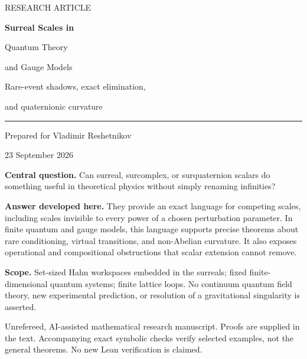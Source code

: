 \documentclass[11pt,oneside]{article}
\numberwithin{equation}{section}
\theoremstyle{plain}
\theoremstyle{definition}
\theoremstyle{remark}
\begin{document}
\begin{titlepage}
\color{ink}
\vspace*{14mm}
{\small\sffamily RESEARCH ARTICLE\par}
\vspace{10mm}
{\Huge\bfseries Surreal Scales in\par Quantum Theory\par and Gauge Models\par}
\vspace{9mm}
{\Large Rare-event shadows, exact elimination,\par and quaternionic curvature\par}
\vspace{13mm}
\noindent\rule{\textwidth}{0.7pt}
\vspace{5mm}
{\large Prepared for Vladimir Reshetnikov\par}
{\normalsize 23 September 2026\par}
\vspace{12mm}
\noindent\begin{minipage}{0.94\textwidth}
\textbf{Central question.} Can surreal, surcomplex, or surquaternion scalars do something useful in theoretical physics without simply renaming infinities?

\medskip
\textbf{Answer developed here.} They provide an exact language for competing scales, including scales invisible to every power of a chosen perturbation parameter. In finite quantum and gauge models, this language supports precise theorems about rare conditioning, virtual transitions, and non-Abelian curvature. It also exposes operational and compositional obstructions that scalar extension cannot remove.

\medskip
\textbf{Scope.} Set-sized Hahn workspaces embedded in the surreals; fixed finite-dimensional quantum systems; finite lattice loops. No continuum quantum field theory, new experimental prediction, or resolution of a gravitational singularity is asserted.
\end{minipage}
\vfill
{\small\color{muted}Unrefereed, AI-assisted mathematical research manuscript. Proofs are supplied in the text. Accompanying exact symbolic checks verify selected examples, not the general theorems. No new Lean verification is claimed.\par}
\end{titlepage}
\end{document}
